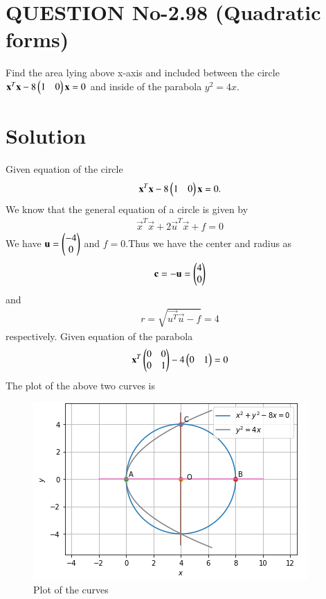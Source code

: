 \documentclass[journal,12pt,twocolumn]{IEEEtran}
\begin{document}
\section{QUESTION No-2.98 (Quadratic forms)}
\item Find the area lying above x-axis and included between the circle $\mathbf{x}^T\mathbf{x}-8\begin{pmatrix}1 & 0\end{pmatrix}\mathbf{x}=0$  and inside of the parabola $y^2 = 4x$.
%

%
\section{Solution}
Given equation of the circle 
\begin{align}
 \mathbf{x}^T\mathbf{x}-8\begin{pmatrix}1 & 0\end{pmatrix}\mathbf{x}=0.  
\end{align}
We know that the general equation of a circle is given by
\begin{align}
  \vec{x}^T\vec{x}+2\vec{u}^T\vec{x}+f=0  
\end{align}
We have $\mathbf{u} = \begin{pmatrix}-4 \\ 0\end{pmatrix}$ and $f = 0$.Thus we have the center and radius as 
\begin{align}
\mathbf{c} = -\mathbf{u} = \begin{pmatrix}4 \\ 0\end{pmatrix}
\end{align} and 
\begin{align}
r= \sqrt{\vec{u^T}\vec{u} - f} = 4
\end{align} respectively.
Given equation of the parabola 
\begin{align}
 \mathbf{x}^T\begin{pmatrix}0&0 \\ 0&1\end{pmatrix}-4\begin{pmatrix}0&1\end{pmatrix}=0   
\end{align}
The plot of the above two curves is
\begin{figure}[ht]
\centering
\includegraphics[width=\columnwidth]{Area.PNG}
\caption{Plot of the curves}
\label{Plot of the curves}
\end{figure}
\end{document}
